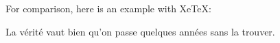 For comparison, here is an example with XeTeX:


La vérité vaut bien qu'on passe quelques années sans la trouver.

\bye



